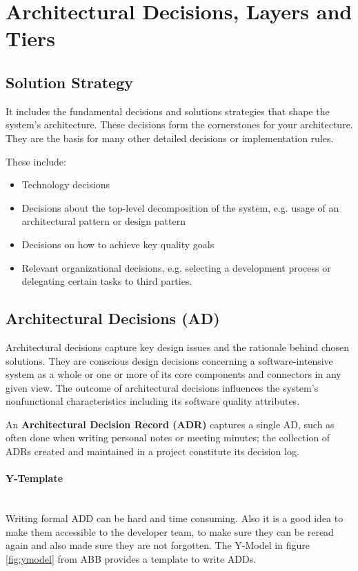 \section{Architectural Decisions, Layers and Tiers}

\subsection{Solution Strategy}
It includes the fundamental decisions and solutions strategies that shape the system's architecture. These decisions form the cornerstones for your architecture. They are the basis for many other detailed decisions or implementation rules. 

These include:
\begin{itemize}
	\item Technology decisions
	\item Decisions about the top-level decomposition of the system, e.g. usage of an architectural pattern or design pattern
	\item Decisions on how to achieve key quality goals
	\item Relevant organizational decisions, e.g. selecting a development process or delegating certain tasks to third parties.
\end{itemize}

\subsection{Architectural Decisions (AD)} 
Architectural decisions capture key design issues and the rationale behind chosen solutions. They are conscious design decisions concerning a software-intensive system as a whole or one or more of its core components and connectors in any given view. The outcome of architectural decisions influences the system’s nonfunctional characteristics including its software quality attributes.

An \textbf{Architectural Decision Record (ADR)} captures a single AD, such as often done when writing personal notes or meeting minutes; the collection of ADRs created and maintained in a project constitute its decision log.

\paragraph{Y-Template} \hfill \\
Writing formal ADD can be hard and time consuming. Also it is a good idea to make them accessible to the developer team, to make sure they can be reread again and also made sure they are not forgotten. The Y-Model in figure \ref{fig:ymodel} from ABB provides a template to write ADDs.

